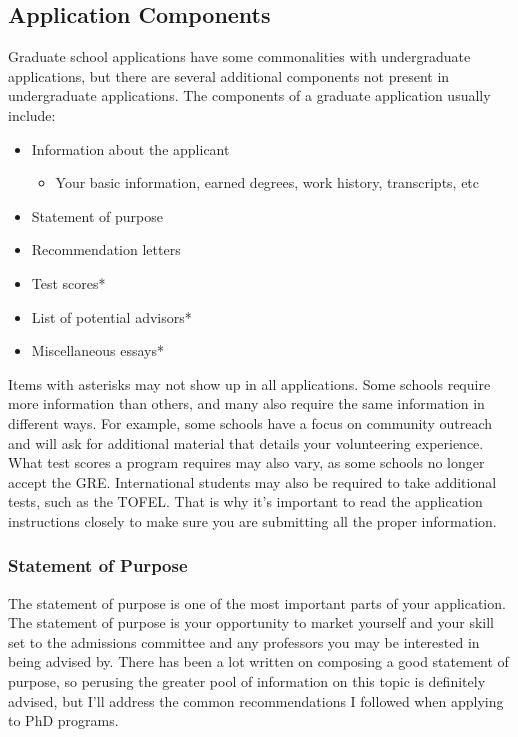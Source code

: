 \documentclass[12pt]{article}
\begin{document}
\subsection{Application Components}

Graduate school applications have some commonalities with undergraduate applications, but there are several additional components not present in undergraduate applications. The components of a graduate application usually include:

\begin{itemize}
    \item Information about the applicant
    \begin{itemize}
        \item Your basic information, earned degrees, work history, transcripts, etc 
    \end{itemize}
    \item Statement of purpose
    \item Recommendation letters
    \item Test scores*
    \item List of potential advisors*
    \item Miscellaneous essays*
\end{itemize}

Items with asterisks may not show up in all applications. Some schools require more information than others, and many also require the same information in different ways. For example, some schools have a focus on community outreach and will ask for additional material that details your volunteering experience. What test scores a program requires may also vary, as some schools no longer accept the GRE. International students may also be required to take additional tests, such as the TOFEL. That is why it's important to read the application instructions closely to make sure you are submitting all the proper information.

\subsubsection{Statement of Purpose}

The statement of purpose is one of the most important parts of your application. The statement of purpose is your opportunity to market yourself and your skill set to the admissions committee and any professors you may be interested in being advised by. There has been a lot written on composing a good statement of purpose, so perusing the greater pool of information on this topic is definitely advised, but I'll address the common recommendations I followed when applying to PhD programs.
\end{document}
